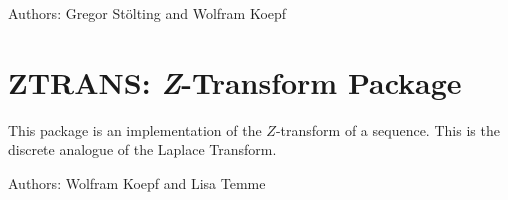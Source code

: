 Authors: Gregor St\"olting and Wolfram Koepf



\newpage

\section{ZTRANS: \textit{Z}-Transform Package}


This package is an implementation of the $Z$-transform of a sequence.
This is the discrete analogue of the Laplace Transform.

Authors: Wolfram Koepf and Lisa Temme



\let\sectionmark=\origsectionmark
